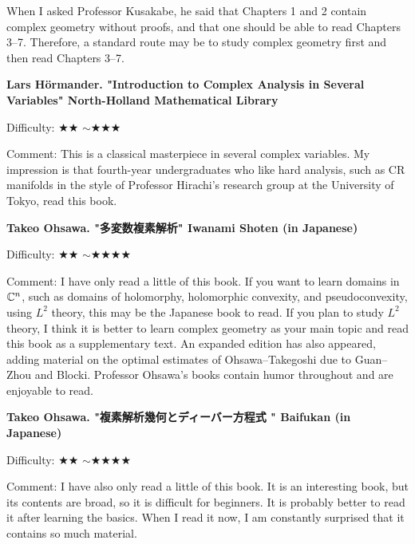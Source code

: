 When I asked Professor Kusakabe, he said that Chapters 1 and 2 contain complex geometry without proofs, and that one should be able to read Chapters 3--7. Therefore, a standard route may be to study complex geometry first and then read Chapters 3--7.
\vspace{8pt}

\textbf{Lars Hörmander. "Introduction to Complex Analysis in Several Variables" North-Holland Mathematical Library}   \vspace{-6pt} 

Difficulty: ★★ $\sim$★★★ \vspace{-6pt} 

Comment: This is a classical masterpiece in several complex variables. My impression is that fourth-year undergraduates who like hard analysis, such as CR manifolds in the style of Professor Hirachi's research group at the University of Tokyo, read this book.
\vspace{8pt}

\textbf{Takeo Ohsawa. "多変数複素解析" Iwanami Shoten  (in Japanese)}  　\vspace{-6pt} 

Difficulty: ★★ $\sim$★★★★ 　\vspace{-6pt} 

Comment: I have only read a little of this book. If you want to learn domains in $\mathbb{C}^n$, such as domains of holomorphy, holomorphic convexity, and pseudoconvexity, using $L^2$ theory, this may be the Japanese book to read. If you plan to study $L^2$ theory, I think it is better to learn complex geometry as your main topic and read this book as a supplementary text. An expanded edition has also appeared, adding material on the optimal estimates of Ohsawa--Takegoshi due to Guan--Zhou and Blocki. Professor Ohsawa's books contain humor throughout and are enjoyable to read.
\vspace{8pt}

\textbf{Takeo Ohsawa. "複素解析幾何とディーバー方程式 " Baifukan  (in Japanese)}  　\vspace{-6pt} 

Difficulty: ★★ $\sim$★★★★ 　\vspace{-6pt} 

Comment: I have also only read a little of this book. It is an interesting book, but its contents are broad, so it is difficult for beginners. It is probably better to read it after learning the basics. When I read it now, I am constantly surprised that it contains so much material.
\vspace{8pt}

